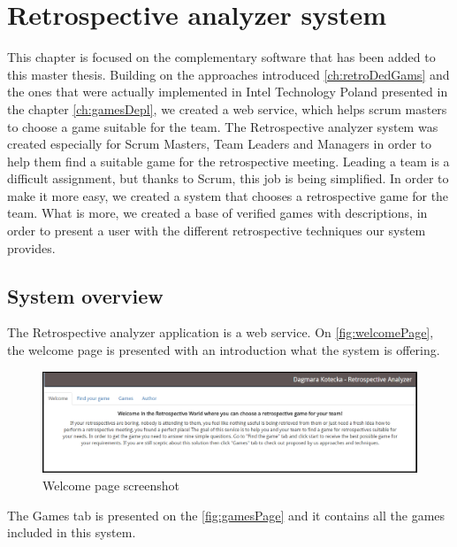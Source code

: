 \chapter{Retrospective analyzer system}

This chapter is focused on the complementary software that has been added to this master thesis. Building on the approaches introduced \autoref{ch:retroDedGams} and the ones that were actually implemented in Intel Technology Poland presented in the chapter \autoref{ch:gamesDepl}, we created a web service, which helps scrum masters to choose a game suitable for the team.
The Retrospective analyzer system was created especially for Scrum Masters, Team Leaders and Managers in order to help them find a suitable game for the retrospective meeting. Leading a team is a difficult assignment, but thanks to Scrum, this job is being simplified. In order to make it more easy, we created a system that chooses a retrospective game for the team. What is more, we created a base of verified games with descriptions, in order to present a user with the different retrospective techniques our system provides. 

\section{System overview}

The Retrospective analyzer application is a web service. On \autoref{fig:welcomePage}, the welcome page is presented with an introduction what the system is offering.

\begin{figure}[h]
\caption{Welcome page screenshot}
\label{fig:welcomePage}
\centering
\includegraphics[width=1\textwidth]{screenshots/welcome.png}
\end{figure}

The Games tab is presented on the \autoref{fig:gamesPage} and it contains all the games included in this system.

